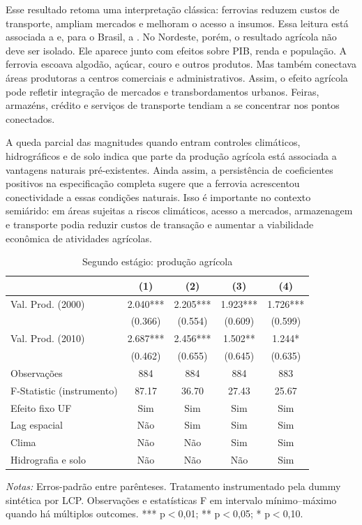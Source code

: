 \documentclass[12pt,a4paper]{article}
\begin{document}
Esse resultado retoma uma interpretação clássica: ferrovias reduzem custos de transporte, ampliam mercados e melhoram o acesso a insumos. Essa leitura está associada a \citet{fogel1964} e, para o Brasil, a \citet{summerhill2005}. No Nordeste, porém, o resultado agrícola não deve ser isolado. Ele aparece junto com efeitos sobre PIB, renda e população. A ferrovia escoava algodão, açúcar, couro e outros produtos. Mas também conectava áreas produtoras a centros comerciais e administrativos. Assim, o efeito agrícola pode refletir integração de mercados e transbordamentos urbanos. Feiras, armazéns, crédito e serviços de transporte tendiam a se concentrar nos pontos conectados.

A queda parcial das magnitudes quando entram controles climáticos, hidrográficos e de solo indica que parte da produção agrícola está associada a vantagens naturais pré-existentes. Ainda assim, a persistência de coeficientes positivos na especificação completa sugere que a ferrovia acrescentou conectividade a essas condições naturais. Isso é importante no contexto semiárido: em áreas sujeitas a riscos climáticos, acesso a mercados, armazenagem e transporte podia reduzir custos de transação e aumentar a viabilidade econômica de atividades agrícolas.

\begin{table}[!htbp]
\centering
\scriptsize
\setlength{\tabcolsep}{3.5pt}
\renewcommand{\arraystretch}{0.80}
\caption{Segundo estágio: produção agrícola}
\label{tab:segundo_estagio_pam}
\begin{tabular}{lcccc}
\toprule
& (1) & (2) & (3) & (4) \\
\midrule
Val. Prod. (2000) & \num{2.040}*** & \num{2.205}*** & \num{1.923}*** & \num{1.726}*** \\
& (\num{0.366}) & (\num{0.554}) & (\num{0.609}) & (\num{0.599}) \\
Val. Prod. (2010) & \num{2.687}*** & \num{2.456}*** & \num{1.502}** & \num{1.244}* \\
& (\num{0.462}) & (\num{0.655}) & (\num{0.645}) & (\num{0.635}) \\
\midrule
Observações & 884 & 884 & 884 & 883 \\
F-Statistic (instrumento) & 87.17 & 36.70 & 27.43 & 25.67 \\
Efeito fixo UF & Sim & Sim & Sim & Sim \\
Lag espacial & Não & Sim & Sim & Sim \\
Clima & Não & Não & Sim & Sim \\
Hidrografia e solo & Não & Não & Não & Sim \\
\bottomrule
\end{tabular}
\begin{minipage}{0.95\textwidth}
\scriptsize \textit{Notas:} Erros-padrão entre parênteses. Tratamento instrumentado pela dummy sintética por LCP. Observações e estatísticas F em intervalo mínimo--máximo quando há múltiplos outcomes. *** p$<$0,01; ** p$<$0,05; * p$<$0,10.
\end{minipage}
\end{table}
\end{document}

